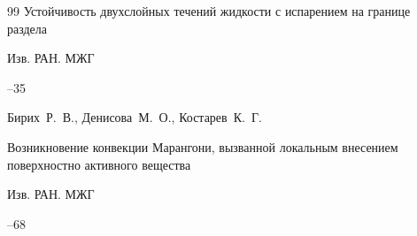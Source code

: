 \begin{thebibliography}{99}
\paper Устойчивость двухслойных течений жидкости с испарением на границе раздела

\jour Изв. РАН. МЖГ



--35


















\by Бирих~Р.~В., Денисова~М.~О.,  Костарев~К.~Г.

\paper Возникновение конвекции Марангони, вызванной локальным внесением поверхностно активного вещества

\jour Изв. РАН. МЖГ



--68











\end{thebibliography}
